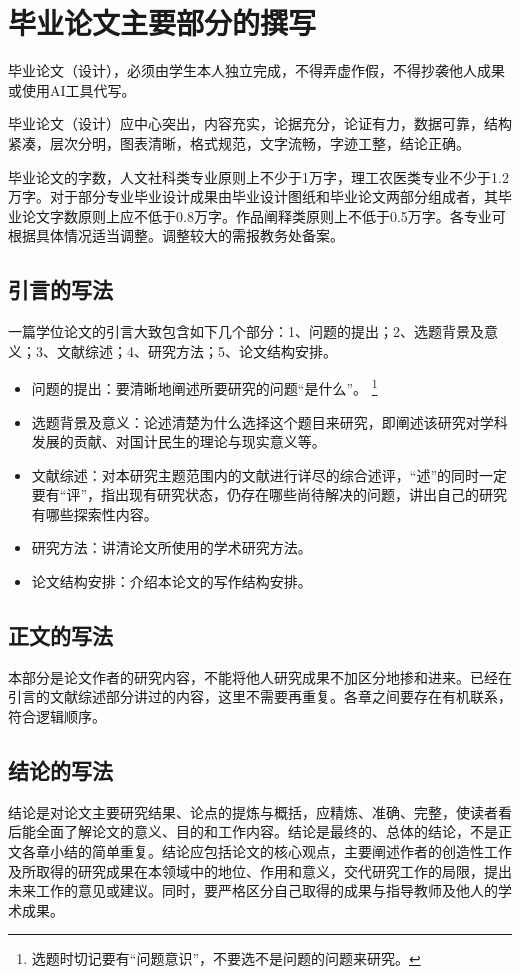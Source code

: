 \documentclass{GZUbachelorthesis}
\begin{document}
\section{毕业论文主要部分的撰写}
毕业论文（设计），必须由学生本人独立完成，不得弄虚作假，不得抄袭他人成果或使用AI工具代写。

毕业论文（设计）应中心突出，内容充实，论据充分，论证有力，数据可靠，结构紧凑，层次分明，图表清晰，格式规范，文字流畅，字迹工整，结论正确。

毕业论文的字数，人文社科类专业原则上不少于1万字，理工农医类专业不少于1.2万字。对于部分专业毕业设计成果由毕业设计图纸和毕业论文两部分组成者，其毕业论文字数原则上应不低于0.8万字。作品阐释类原则上不低于0.5万字。各专业可根据具体情况适当调整。调整较大的需报教务处备案。

\subsection{引言的写法}
一篇学位论文的引言大致包含如下几个部分：1、问题的提出；2、选题背景及意义；3、文献综述；4、研究方法；5、论文结构安排。
\begin{itemize}
  \item 问题的提出：要清晰地阐述所要研究的问题“是什么”。
    \footnote{选题时切记要有“问题意识”，不要选不是问题的问题来研究。}
  \item 选题背景及意义：论述清楚为什么选择这个题目来研究，即阐述该研究对学科发展的贡献、对国计民生的理论与现实意义等。
  \item 文献综述：对本研究主题范围内的文献进行详尽的综合述评，“述”的同时一定要有“评”，指出现有研究状态，仍存在哪些尚待解决的问题，讲出自己的研究有哪些探索性内容。
  \item 研究方法：讲清论文所使用的学术研究方法。
  \item 论文结构安排：介绍本论文的写作结构安排。
\end{itemize}

\subsection{正文的写法}
本部分是论文作者的研究内容，不能将他人研究成果不加区分地掺和进来。已经在引言的文献综述部分讲过的内容，这里不需要再重复。各章之间要存在有机联系，符合逻辑顺序。

\subsection{结论的写法}
结论是对论文主要研究结果、论点的提炼与概括，应精炼、准确、完整，使读者看后能全面了解论文的意义、目的和工作内容。结论是最终的、总体的结论，不是正文各章小结的简单重复。结论应包括论文的核心观点，主要阐述作者的创造性工作及所取得的研究成果在本领域中的地位、作用和意义，交代研究工作的局限，提出未来工作的意见或建议。同时，要严格区分自己取得的成果与指导教师及他人的学术成果。
\end{document}

